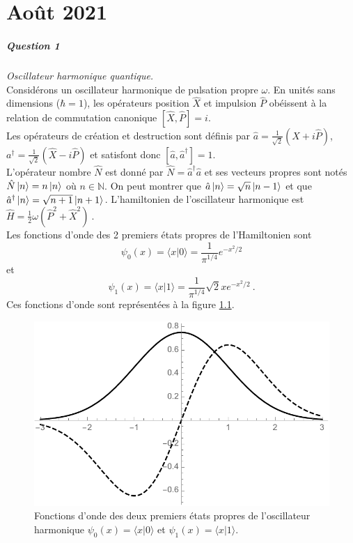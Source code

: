 \chapter{Août 2021}

\paragraph{Question 1} \textit{Oscillateur harmonique quantique.} \\

Considérons un oscillateur harmonique de pulsation propre $\omega$. En unités sans dimensions ($\hbar=1$), les opérateurs position $\hat X$ et impulsion $\hat P$ obéissent à la relation de commutation canonique $[\hat X, \hat P]=i $. \\

Les opérateurs de création et destruction sont définis par 
$\hat a= \frac{1}{\sqrt{2}}(\hat X+i\hat P)$, $a^\dagger= \frac{1}{\sqrt{2}}(\hat X-i\hat P)$ et satisfont donc $[\hat a,\hat a^\dagger]=1$. \\

L'opérateur nombre $\hat N$ est donné par $\hat N= \hat a^\dagger \hat a$ et ses vecteurs propres sont notés $\hat N \ket{n} =n \ket{n}$ où $n \in \mathbb{N}$. On peut montrer que $\hat a \ket{n} =\sqrt{n} \ket{n-1}$ et que $\hat a^\dagger \ket{n} =\sqrt{n+1} \ket{n+1}$. L'hamiltonien de l'oscillateur harmonique est $\hat H = \frac{1}{2}\omega ( \hat P^2 + \hat X^2 )\ $. \\

Les fonctions d'onde des 2 premiers états propres de l'Hamiltonien sont 
$$\psi_0(x)=\langle x \vert 0\rangle = \frac{1}{\pi^{1/4}} e^{-x^2/2}$$
et
$$\psi_1(x)=\langle x \vert 1\rangle = \frac{1}{\pi^{1/4}} \sqrt{2} x e^{-x^2/2}\ .$$
Ces fonctions d'onde sont représentées à la figure \ref{fig:Psi01}.


\begin{figure}[h!]
\begin{center}
\includegraphics[width=0.5\columnwidth]{Pictures/Psi0Psi1.pdf} 
\end{center}
\caption{Fonctions d'onde des deux premiers états propres de l'oscillateur harmonique $\psi_0(x)=\langle x \vert 0\rangle$ et $\psi_1(x)=\langle x \vert 1\rangle$. }
\label{fig:Psi01}
\end{figure}

